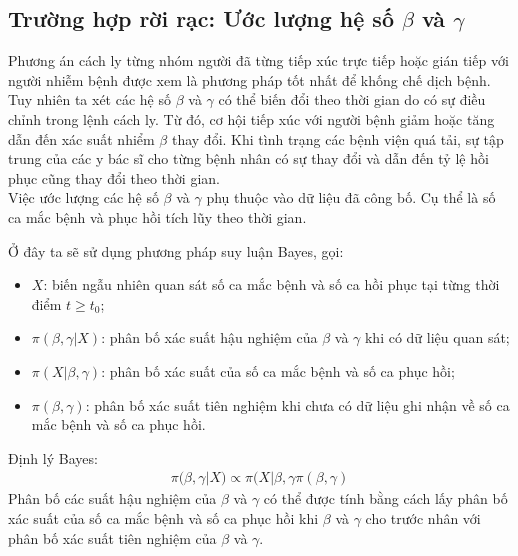 \documentclass[a4paper]{article}
\begin{document}
\break 

\subsection{Trường hợp rời rạc: Ước lượng hệ số  $\beta$ và $\gamma$}
Phương án cách ly từng nhóm người đã từng tiếp xúc trực tiếp hoặc gián tiếp với người nhiễm bệnh được xem là phương pháp tốt nhất để khống chế dịch bệnh. Tuy nhiên ta xét các hệ số $\beta$ và $\gamma$ có thể biến đổi theo thời gian do có sự điều chỉnh trong lệnh cách ly. Từ đó, cơ hội tiếp xúc với người bệnh giảm hoặc tăng dẫn đến xác suất nhiểm $\beta$ thay đổi. Khi tình trạng các bệnh viện quá tải, sự tập trung của các y bác sĩ cho từng bệnh nhân có sự thay đổi và dẫn đến tỷ lệ hồi phục cũng thay đổi theo thời gian.\\ 
Việc ước lượng các hệ số $\beta$ và $\gamma$ phụ thuộc vào dữ liệu đã công bố. Cụ thể là số ca mắc bệnh và phục hồi tích lũy theo thời gian.

Ở đây ta sẽ sử dụng phương pháp suy luận Bayes, gọi:
\begin{itemize}
    \item $X$: biến ngẫu nhiên quan sát số ca mắc bệnh và số ca hồi phục tại từng thời điểm $t \geq t_{0}$;
    \item $\pi (\beta,\gamma|X)$: phân bố xác suất hậu nghiệm của  $\beta$ và $\gamma$  khi có dữ liệu quan sát;
    \item $\pi (X|\beta,\gamma)$: phân bố xác suất của số ca mắc bệnh và số ca phục hồi;
    \item$\pi (\beta,\gamma)$: phân bố xác suất tiên nghiệm khi chưa có dữ liệu ghi nhận về số ca mắc bệnh và số ca phục hồi.
\end{itemize}
Định lý Bayes:
\begin{align}
    \pi (\beta,\gamma|X) \propto \pi (X|\beta,\gamma \pi (\beta,\gamma)
\end{align}
Phân bố các suất hậu nghiệm của $\beta$ và $\gamma$ có thể được tính bằng cách lấy phân bố xác suất của số ca mắc bệnh và số ca phục hồi  khi $\beta$ và $\gamma$ cho trước nhân với phân bố xác suất tiên nghiệm của $\beta$ và $\gamma$.
\end{document}

